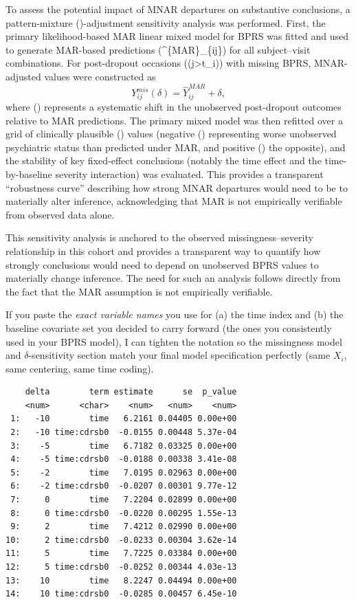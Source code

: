 \documentclass[
  11pt,
  letterpaper,
  DIV=11,
  numbers=noendperiod]{scrartcl}
\begin{document}
To assess the potential impact of MNAR departures on substantive
conclusions, a pattern-mixture (\delta)-adjustment sensitivity analysis
was performed. First, the primary likelihood-based MAR linear mixed
model for BPRS was fitted and used to generate MAR-based predictions
(\^{}\{MAR\}\_\{ij\}) for all subject--visit combinations.
For post-dropout occasions ((j\textgreater t\_i)) with missing BPRS,
MNAR-adjusted values were constructed as \[
Y^{mis}_{ij}(\delta)=\widehat{Y}^{MAR}_{ij}+\delta,
\] where (\delta) represents a systematic shift in the unobserved
post-dropout outcomes relative to MAR predictions. The primary mixed
model was then refitted over a grid of clinically plausible (\delta)
values (negative (\delta) representing worse unobserved psychiatric
status than predicted under MAR, and positive (\delta) the opposite),
and the stability of key fixed-effect conclusions (notably the time
effect and the time-by-baseline severity interaction) was evaluated.
This provides a transparent ``robustness curve'' describing how strong
MNAR departures would need to be to materially alter inference,
acknowledging that MAR is not empirically verifiable from observed data
alone.

This sensitivity analysis is anchored to the observed
missingness--severity relationship in this cohort and provides a
transparent way to quantify how strongly conclusions would need to
depend on unobserved BPRS values to materially change inference. The
need for such an analysis follows directly from the fact that the MAR
assumption is not empirically verifiable.

If you paste the \emph{exact variable names} you use for (a) the time
index and (b) the baseline covariate set you decided to carry forward
(the ones you consistently used in your BPRS model), I can tighten the
notation so the missingness model and \(\delta\)-sensitivity section
match your final model specification perfectly (same \(X_i\), same
centering, same time coding).

\begin{verbatim}
    delta        term estimate      se  p_value
    <num>      <char>    <num>   <num>    <num>
 1:   -10        time   6.2161 0.04405 0.00e+00
 2:   -10 time:cdrsb0  -0.0155 0.00448 5.37e-04
 3:    -5        time   6.7182 0.03325 0.00e+00
 4:    -5 time:cdrsb0  -0.0188 0.00338 3.41e-08
 5:    -2        time   7.0195 0.02963 0.00e+00
 6:    -2 time:cdrsb0  -0.0207 0.00301 9.77e-12
 7:     0        time   7.2204 0.02899 0.00e+00
 8:     0 time:cdrsb0  -0.0220 0.00295 1.55e-13
 9:     2        time   7.4212 0.02990 0.00e+00
10:     2 time:cdrsb0  -0.0233 0.00304 3.62e-14
11:     5        time   7.7225 0.03384 0.00e+00
12:     5 time:cdrsb0  -0.0252 0.00344 4.03e-13
13:    10        time   8.2247 0.04494 0.00e+00
14:    10 time:cdrsb0  -0.0285 0.00457 6.45e-10
\end{verbatim}
\end{document}

